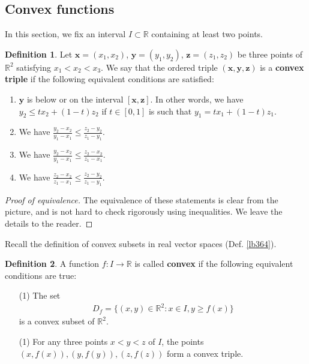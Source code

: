 \documentclass[12pt,b5paper,notitlepage]{article}
\theoremstyle{definition}
\newtheorem{df}{Definition}[section]
\theoremstyle{plain}
\newcommand{\mbf}{\mathbf}
\newcommand{\Rbb}{\mathbb R}
\newcommand{\dps}{\displaystyle}
\numberwithin{equation}{section}
\begin{document}
\subsection{Convex functions}






In this section, we fix an interval $I\subset\Rbb$ containing at least two points.


\begin{df}
Let $\mbf x=(x_1,x_2)$, $\mbf y=(y_1,y_2)$, $\mbf z=(z_1,z_2)$ be three points of $\Rbb^2$ satisfying $x_1<x_2<x_3$. We say that the ordered triple $(\mbf x,\mbf y,\mbf z)$ is a \textbf{convex triple}  if  the following equivalent conditions are satisfied:
\begin{enumerate}[label=(\arabic*)]
\item $\mbf y$ is below or on the interval $[\mbf x,\mbf z]$. In other words, we have $y_2\leq tx_2+(1-t)z_2$ if $t\in[0,1]$ is such that $y_1= tx_1+(1-t)z_1$.
\item We have $\dps \frac{y_2-x_2}{y_1-x_1}\leq \frac{z_2-y_2}{z_1-y_1}$.
\item We have $\dps \frac{y_2-x_2}{y_1-x_1}\leq \frac{z_2-x_2}{z_1-x_1}$.
\item We have $\dps \frac{z_2-x_2}{z_1-x_1}\leq\frac{z_2-y_2}{z_1-y_1}$.
\end{enumerate}
\end{df}

\begin{proof}[Proof of equivalence]
The equivalence of these statements is clear from the picture, and is not hard to check rigorously using inequalities. We leave the details to the reader.
\end{proof}


Recall the definition of convex subsets in real vector spaces (Def. \ref{lb364}).

\begin{df}
A function $f:I\rightarrow\Rbb$ is called \textbf{convex} if the following equivalent conditions are true:
\begin{enumerate}
\item[(1)] The set
\begin{align}
D_f=\{(x,y)\in\Rbb^2:x\in I,y\geq f(x)\}\label{eq147}
\end{align}
is a convex subset of $\Rbb^2$. 
\item[(1)] For any three points $x<y<z$ of $I$, the points $(x,f(x)),(y,f(y)),(z,f(z))$ form a convex triple.
\end{enumerate}
\end{df}
\end{document}
